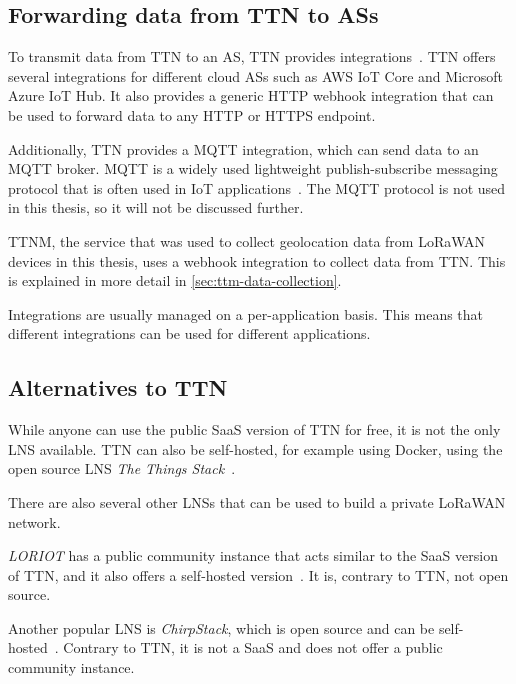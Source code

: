 \subsection{Forwarding data from \acl{TTN} to \aclp{AS}}\label{sec:forwarding-data-from-ttn-to-as}

To transmit data from \ac{TTN} to an \ac{AS}, \ac{TTN} provides integrations~\cite{the_things_network_integrations_2021}.
\ac{TTN} offers several integrations for different cloud \acp{AS} such as \ac{AWS} IoT Core and Microsoft Azure IoT Hub.
It also provides a generic \ac{HTTP} webhook integration that can be used to forward data to any \ac{HTTP} or \ac{HTTPS} endpoint.

Additionally, \ac{TTN} provides a MQTT integration, which can send data to an MQTT broker.
MQTT is a widely used lightweight publish-subscribe messaging protocol that is often used in \ac{IoT} applications~\cite{mqtt_mqtt_2022}.
The MQTT protocol is not used in this thesis, so it will not be discussed further.

\ac{TTNM}, the service that was used to collect geolocation data from \ac{LoRaWAN} devices in this thesis, uses a webhook integration to collect data from \ac{TTN}.
This is explained in more detail in \cref{sec:ttm-data-collection}.

Integrations are usually managed on a per-application basis.
This means that different integrations can be used for different applications.

\subsection{Alternatives to \acl{TTN}}

While anyone can use the public \ac{SaaS} version of \ac{TTN} for free, it is not the only \ac{LNS} available.
\ac{TTN} can also be self-hosted, for example using Docker, using the open source \ac{LNS} \emph{The Things Stack}~\cite{the_things_network_host_2023}.

There are also several other \acp{LNS} that can be used to build a private \ac{LoRaWAN} network.

\emph{LORIOT} has a public community instance that acts similar to the \ac{SaaS} version of \ac{TTN}, and it also offers a self-hosted version~\cite{loriot_ag_loriot_2023}.
It is, contrary to \ac{TTN}, not open source.

Another popular \ac{LNS} is \emph{ChirpStack}, which is open source and can be self-hosted~\cite{chirpstack_chirpstack_2023}.
Contrary to \ac{TTN}, it is not a \ac{SaaS} and does not offer a public community instance.

